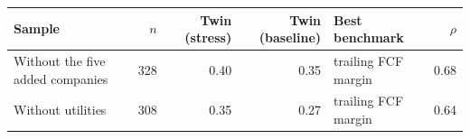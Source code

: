 \begin{tabular}{lrrrlr}
\toprule
Sample & $n$ & Twin (stress) & Twin (baseline) & Best benchmark & $\rho$ \\
\midrule
Without the five added companies & 328 & 0.40 & 0.35 & trailing FCF margin & 0.68 \\
Without utilities & 308 & 0.35 & 0.27 & trailing FCF margin & 0.64 \\
\bottomrule
\end{tabular}
